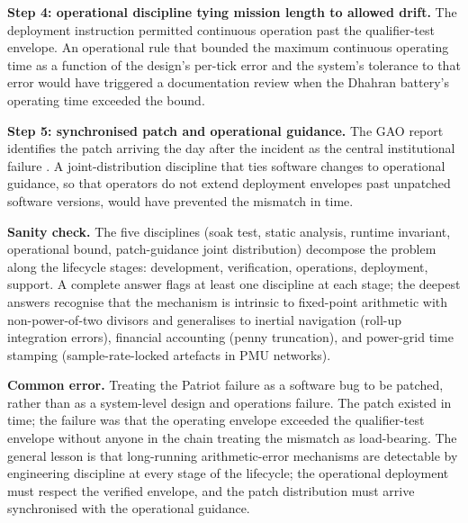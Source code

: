 \begin{exercise}
\textbf{Step 4: operational discipline tying mission length to
allowed drift.} The deployment instruction permitted continuous
operation past the qualifier-test envelope. An operational rule
that bounded the maximum continuous operating time as a function
of the design's per-tick error and the system's tolerance to
that error would have triggered a documentation review when the
Dhahran battery's operating time exceeded the bound.

\textbf{Step 5: synchronised patch and operational guidance.}
The GAO report identifies the patch arriving the day after the
incident as the central institutional failure
\cite{acc:gao-patriot-1992}. A joint-distribution discipline that
ties software changes to operational guidance, so that operators
do not extend deployment envelopes past unpatched software
versions, would have prevented the mismatch in time.

\textbf{Sanity check.} The five disciplines (soak test, static
analysis, runtime invariant, operational bound,
patch-guidance joint distribution) decompose the problem along
the lifecycle stages: development, verification, operations,
deployment, support. A complete answer flags at least one
discipline at each stage; the deepest answers recognise that the
mechanism is intrinsic to fixed-point arithmetic with
non-power-of-two divisors and generalises to inertial navigation
(roll-up integration errors), financial accounting (penny
truncation), and power-grid time stamping (sample-rate-locked
artefacts in PMU networks).

\textbf{Common error.} Treating the Patriot failure as a software
bug to be patched, rather than as a system-level design and
operations failure. The patch existed in time; the failure was
that the operating envelope exceeded the qualifier-test envelope
without anyone in the chain treating the mismatch as
load-bearing. The general lesson is that long-running
arithmetic-error mechanisms are detectable by engineering
discipline at every stage of the lifecycle; the operational
deployment must respect the verified envelope, and the patch
distribution must arrive synchronised with the operational
guidance.
\end{exercise}

